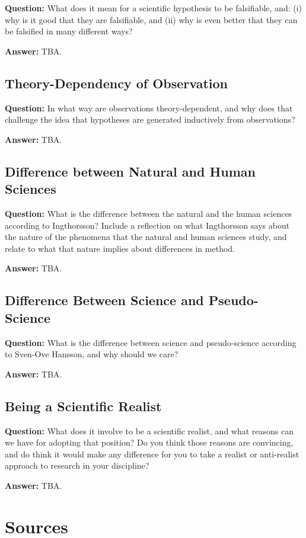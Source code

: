 \documentclass[11pt]{scrartcl}
\begin{document}
\textbf{Question:} What does it mean for a scientific hypothesis to be falsifiable, and: (i) why is it good that they are falsifiable, and (ii) why is even better that they can be falsified in many different ways?

\bigbreak

\textbf{Answer:} TBA.

\subsection{Theory-Dependency of Observation}

\textbf{Question:} In what way are observations theory-dependent, and why does that challenge the idea that hypotheses are generated inductively from observations?

\bigbreak

\textbf{Answer:} TBA.

\subsection{Difference between Natural and Human Sciences}

\textbf{Question:} What is the difference between the natural and the human sciences according to Ingthorsson? Include a reflection on what Ingthorsson says about the nature of the phenomena that the natural and human sciences study, and relate to what that nature implies about differences in method.

\bigbreak

\textbf{Answer:} TBA.

\subsection{Difference Between Science and Pseudo-Science}

\textbf{Question:} What is the difference between science and pseudo-science according to Sven-Ove Hansson, and why should we care?

\bigbreak

\textbf{Answer:} TBA.

\subsection{Being a Scientific Realist}

\textbf{Question:} What does it involve to be a scientific realist, and what reasons can we have for adopting that position? Do you think those reasons are convincing, and do think it would make any difference for you to take a realist or anti-realist approach to research in your discipline?

\bigbreak

\textbf{Answer:} TBA.

\section{Sources}



\end{document}
